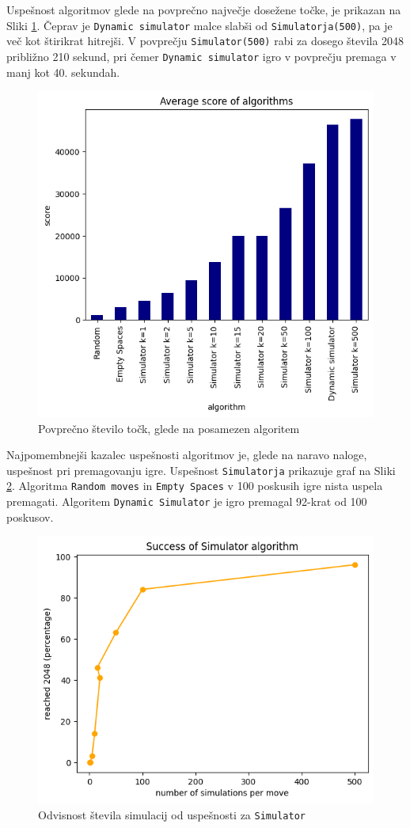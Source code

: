 \documentclass{article}
\begin{document}
Uspešnost algoritmov glede na povprečno največje dosežene točke, je prikazan na Sliki \ref{score}. Čeprav je \texttt{Dynamic simulator} malce slabši od \texttt{Simulatorja(500)}, pa je več kot štirikrat hitrejši. V povprečju \texttt{Simulator(500)} rabi za dosego števila 2048 približno 210 sekund, pri čemer \texttt{Dynamic simulator} igro v povprečju premaga v manj kot 40. sekundah.

\begin{figure}[ht!]
\centering
\includegraphics[width=12cm]{score.png}
\caption{Povprečno število točk, glede na posamezen algoritem}
\label{score}
\end{figure}

Najpomembnejši kazalec uspešnosti algoritmov je, glede na naravo naloge, uspešnost pri premagovanju igre. Uspešnost \texttt{Simulatorja} prikazuje graf na Sliki \ref{performance}. Algoritma \texttt{Random moves} in \texttt{Empty Spaces} v 100 poskusih igre nista uspela premagati. Algoritem \texttt{Dynamic Simulator} je igro premagal 92-krat od 100 poskusov.

\begin{figure}[ht!]
\centering
\includegraphics[width=12cm]{simulator.png}
\caption{Odvisnost števila simulacij od uspešnosti za \texttt{Simulator}}
\label{performance}
\end{figure}
\end{document}
